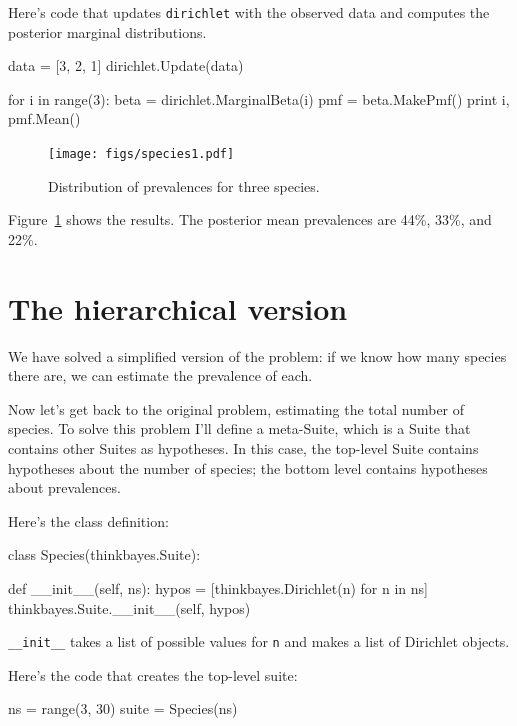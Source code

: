 \documentclass[12pt]{book}
\theoremstyle{exercise}
\begin{document}
Here's code that updates {\tt dirichlet} with the observed data and
computes the posterior marginal distributions.

\begin{code}
    data = [3, 2, 1]
    dirichlet.Update(data)

    for i in range(3):
        beta = dirichlet.MarginalBeta(i)
        pmf = beta.MakePmf()
        print i, pmf.Mean()
\end{code}

\begin{figure}
\centerline{\texttt{[image: figs/species1.pdf]}}
\caption{Distribution of prevalences for three species.}
\label{fig.species1}
\end{figure}

Figure~\ref{fig.species1} shows the results.  The posterior
mean prevalences are 44\%, 33\%, and 22\%.


\section{The hierarchical version}

We have solved a simplified version of the problem: if we
know how many species there are, we can estimate the prevalence
of each.

Now let's get back to the original problem, estimating the total
number of species.  To solve this problem I'll define a meta-Suite,
which is a Suite that contains other Suites as hypotheses.  In this
case, the top-level Suite contains hypotheses about the number of
species; the bottom level contains hypotheses about prevalences.

Here's the class definition:

\begin{code}
class Species(thinkbayes.Suite):

    def __init__(self, ns):
        hypos = [thinkbayes.Dirichlet(n) for n in ns]
        thinkbayes.Suite.__init__(self, hypos)
\end{code}

\verb"__init__" takes a list of possible values for {\tt n} and
makes a list of Dirichlet objects.

Here's the code that creates the top-level suite:

\begin{code}
    ns = range(3, 30)
    suite = Species(ns)
\end{code}
\end{document}
